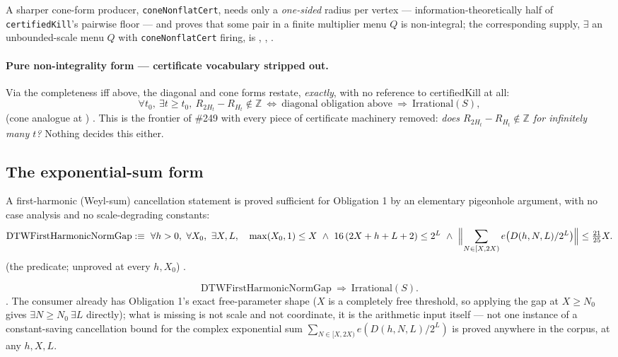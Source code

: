 A sharper cone-form producer,
\texttt{coneNonflatCert}, needs only a \emph{one-sided} radius per vertex —
information-theoretically half of \texttt{certifiedKill}'s pairwise floor —
and proves that some pair in a finite multiplier menu $Q$ is non-integral;
the corresponding supply,
$\exists$ an unbounded-scale menu $Q$ with \texttt{coneNonflatCert} firing,
is , ,
.

\paragraph{Pure non-integrality form — certificate vocabulary stripped out.}
Via the completeness iff above, the diagonal and cone forms restate,
\emph{exactly}, with no reference to $\mathrm{certifiedKill}$ at all:
\[
  \forall t_0,\ \exists t\ge t_0,\ R_{2H_t}-R_{H_t}\notin\mathbb{Z}
  \ \Longleftrightarrow\ \text{diagonal obligation above}
  \ \Longrightarrow\ \mathrm{Irrational}(S),
\]
(cone analogue at
)
\quad {} \quad {} \quad {}.
This is the frontier of \#249 with every piece of certificate machinery
removed: \emph{does $R_{2H_t}-R_{H_t}\notin\mathbb{Z}$ for infinitely many
$t$?} Nothing decides this either.

\subsection{The exponential-sum form}

A first-harmonic (Weyl-sum) cancellation statement is proved sufficient for
Obligation 1 by an elementary pigeonhole argument, with no case analysis and
no scale-degrading constants:
\[
  \mathrm{DTWFirstHarmonicNormGap} :\equiv\
  \forall h>0,\ \forall X_0,\ \exists X,L,\quad
  \max(X_0,1)\le X\ \wedge\
  16\,(2X+h+L+2)\le 2^L\ \wedge\
  \Bigl\|\sum_{N\in[X,2X)} e\bigl(D(h,N,L)/2^L\bigr)\Bigr\| \le \tfrac{21}{25}X.
\]
\quad \ev{Open} (the predicate; unproved at every $h,X_0$)
\quad {} \quad {}.

\[
  \mathrm{DTWFirstHarmonicNormGap} \ \Longrightarrow\ \mathrm{Irrational}(S).
\]
\quad \ev{Lean} \quad \scale{cofinal} \quad \coord{other:first-harmonic}. The
consumer already has Obligation 1's exact free-parameter shape ($X$ is a
completely free threshold, so applying the gap at $X\ge N_0$ gives
$\exists N\ge N_0\ \exists L$ directly); what is missing is not scale and not
coordinate, it is the arithmetic input itself — not one instance of a
constant-saving cancellation bound for the complex exponential sum
$\sum_{N\in[X,2X)} e(D(h,N,L)/2^L)$ is proved anywhere in the corpus, at any
$h,X,L$.


